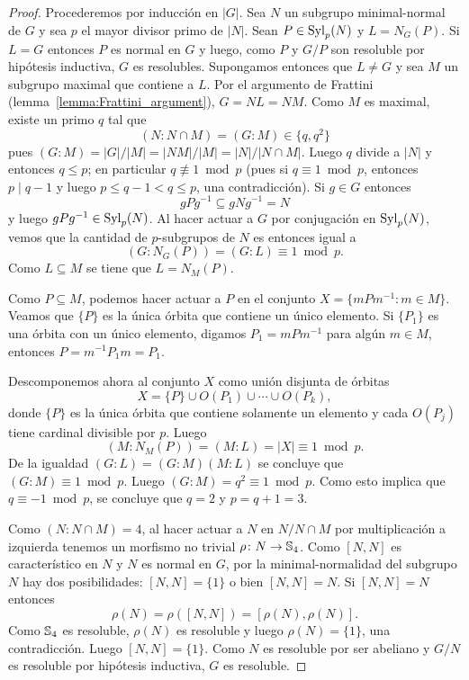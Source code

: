 \begin{proof}
	Procederemos por inducción en $|G|$. Sea $N$ un subgrupo minimal-normal de
	$G$ y sea $p$ el mayor divisor primo de $|N|$. Sean $P\in\mathrm{Syl}_p(N)$ y
	$L=N_G(P)$. Si $L=G$ entonces $P$ es normal en $G$ y luego, como $P$ y
	$G/P$ son resoluble por hipótesis inductiva, $G$ es resolubles. Supongamos
	entonces que $L\ne G$ y sea $M$ un subgrupo maximal que contiene a $L$. 
	Por el argumento de Frattini (lemma~\ref{lemma:Frattini_argument}),  
	$G=NL=NM$. Como $M$ es maximal, 
	existe un primo $q$ tal que 
	\[
	(N:N\cap M)=(G:M)\in\{q,q^2\}
	\]
	pues $(G:M)=|G|/|M|=|NM|/|M|=|N|/|N\cap M|$.  
	Luego $q$ divide a $|N|$ y entonces $q\leq p$; en particular $q\not\equiv
	1\bmod p$ (pues si $q\equiv1\bmod p$, entonces $p\mid q-1$ y luego $p\leq q-1<q\leq p$, una contradicción). 
	Si $g\in G$ entonces 
	\[
	gPg^{-1}\subseteq gNg^{-1}=N
	\]
	y luego $gPg^{-1}\in\mathrm{Syl}_p(N)$. Al hacer actuar a $G$ por conjugación en
	$\mathrm{Syl}_p(N)$, vemos que la cantidad de $p$-subgrupos de $N$ es entonces
	igual a 
	\[
		(G:N_G(P))=(G:L)\equiv 1\bmod p.	
	\]
	Como $L\subseteq M$ se tiene que $L=N_M(P)$. 
	
	Como $P\subseteq M$, podemos hacer actuar
	a $P$ en el conjunto $X=\{mPm^{-1}:m\in M\}$. Veamos que $\{P\}$ es la
	única órbita que contiene un único elemento. Si $\{P_1\}$ es una órbita con
	un único elemento, digamos $P_1=mPm^{-1}$ para algún $m\in M$, entonces
 	$P=m^{-1}P_1m=P_1$. 

    Descomponemos ahora al conjunto $X$ como unión
	disjunta de órbitas
	\[
	X=\{P\}\cup O(P_1)\cup\cdots\cup O(P_k),
	\]
	donde $\{P\}$ es la única órbita que contiene solamente un elemento y cada
	$O(P_j)$ tiene cardinal divisible por $p$. 
	Luego 
	\[
		(M:N_M(P))=(M:L)=|X|\equiv1\bmod p.
	\]
	De la igualdad $(G:L)=(G:M)(M:L)$ se concluye que $(G:M)\equiv1\bmod p$.
	Luego $(G:M)=q^2\equiv 1\bmod p$. Como esto implica que $q\equiv -1\bmod
	p$, se concluye que $q=2$ y $p=q+1=3$.

	Como $(N:N\cap M)=4$, al hacer actuar a $N$ en $N/N\cap M$ por
	multiplicación a izquierda tenemos un morfismo no trivial $\rho\colon
	N\to\mathbb{S}_4$. Como $[N,N]$ es característico en $N$ y $N$ es normal en $G$,
	por la minimal-normalidad del subgrupo $N$ hay dos posibilidades: $[N,N]=\{1\}$ o bien 
	$[N,N]=N$. Si $[N,N]=N$ entonces
	\[
	\rho(N)=\rho([N,N])=[\rho(N),\rho(N)].
	\]
	Como $\mathbb{S}_4$ es resoluble, $\rho(N)$ es resoluble y luego $\rho(N)=\{1\}$, una
	contradicción. Luego $[N,N]=\{1\}$. Como $N$ es resoluble por ser abeliano
	y $G/N$ es resoluble por hipótesis inductiva, $G$ es resoluble.
\end{proof}

